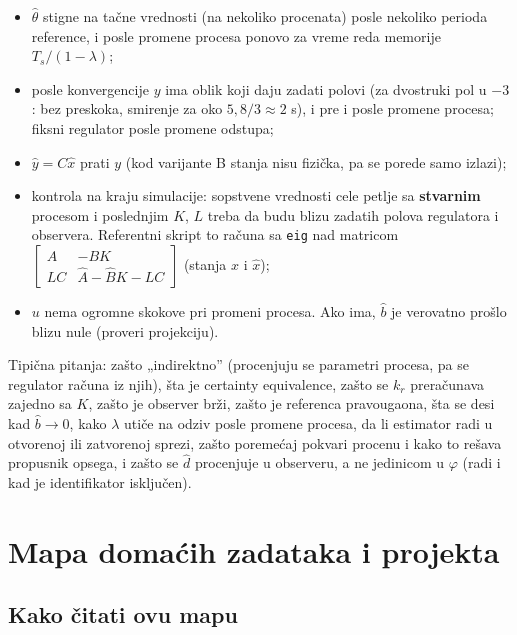\documentclass[11pt,a4paper,parskip=half,headsepline,numbers=noenddot]{scrartcl}
\begin{document}
\begin{itemize}
\item \(\hat\theta\) stigne na tačne vrednosti (na nekoliko procenata) posle nekoliko perioda reference, i posle promene procesa ponovo za vreme reda memorije \(T_s/(1-\lambda)\);
\item posle konvergencije \(y\) ima oblik koji daju zadati polovi (za dvostruki pol u \(-3\): bez preskoka, smirenje za oko \(5{,}8/3 \approx 2\) s), i pre i posle promene procesa; fiksni regulator posle promene odstupa;
\item \(\hat y = C\hat x\) prati \(y\) (kod varijante B stanja nisu fizička, pa se porede samo izlazi);
\item kontrola na kraju simulacije: sopstvene vrednosti cele petlje sa \textbf{stvarnim} procesom i poslednjim \(K\), \(L\) treba da budu blizu zadatih polova regulatora i observera. Referentni skript to računa sa \texttt{eig} nad matricom \(\begin{bmatrix}A & -BK\\ LC & \hat A - \hat BK - LC\end{bmatrix}\) (stanja \(x\) i \(\hat x\));
\item \(u\) nema ogromne skokove pri promeni procesa. Ako ima, \(\hat b\) je verovatno prošlo blizu nule (proveri projekciju).
\end{itemize}

\begin{ispit}
Tipična pitanja: zašto „indirektno'' (procenjuju se parametri procesa, pa se regulator računa iz njih), šta je certainty equivalence, zašto se \(k_r\) preračunava zajedno sa \(K\), zašto je observer brži, zašto je referenca pravougaona, šta se desi kad \(\hat b \to 0\), kako \(\lambda\) utiče na odziv posle promene procesa, da li estimator radi u otvorenoj ili zatvorenoj sprezi, zašto poremećaj pokvari procenu i kako to rešava propusnik opsega, i zašto se \(\hat d\) procenjuje u observeru, a ne jedinicom u \(\varphi\) (radi i kad je identifikator isključen).
\end{ispit}

\section{Mapa domaćih zadataka i projekta}

\subsection{Kako čitati ovu mapu}
\end{document}
